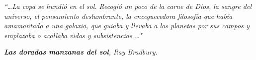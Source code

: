 \documentclass[11pt,twoside,a4paper]{Thesis} %
\title{\ttitle} %
\begin{document}
\frontmatter %


\fancyhead{} %
\rhead{\thepage} %
\lhead{} %

\pagestyle{fancy} %

\newcommand{\HRule}{\rule{\linewidth}{0.5mm}} %

\hypersetup{pdfsubject=\subjectname}
\hypersetup{pdfauthor=\authornames}
\hypersetup{pdfkeywords=\keywordnames}



\thispagestyle{empty}
\mbox{}
\pagestyle{empty}
\newpage


\null\vfill %

\textit{``\ldots La copa se hundió en el sol. Recogió un poco de la carne de Dios, la sangre del universo, el pensamiento deslumbrante, la enceguecedora filosofía que había amamantado a una galaxia, que guiaba y llevaba a los planetas por sus campos y emplazaba o acallaba vidas y subsistencias \ldots"}
\begin{flushright}
\textit{{\bf Las doradas manzanas del sol}, Ray Bradbury.}
\end{flushright}

\vfill\vfill\vfill\vfill\vfill\vfill\null %

\clearpage %

\end{document}
